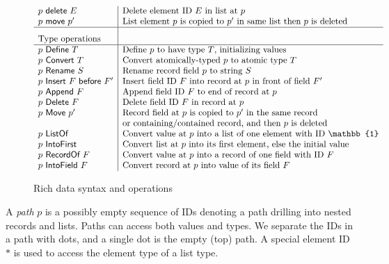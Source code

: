 \documentclass[english,submission]{programming}
\theoremstyle{definition}
\newcommand{\mathbox}[1]{\colorbox{black!10}{$#1$\phantom{i\hspace{-3.5pt}}}}
\providecommand{\DIFaddendFL}{} %
\begin{document}
\begin{figure}[h]
{\[\begin{array}{l|l}
  p \textsf{ delete } E & \textrm{Delete element ID $E$ in list at $p$}\\

  p \textsf{ move } p' & \textrm{List element $p$ is copied to $p'$ in same list then $p$ is deleted}\\
  \hline

  \textrm{Type operations} & \rule[0pt]{0pt}{16pt}\\
  \hline
  p \textsf{ Define } T & \textrm{Define $p$ to have type $T$, initializing values}\\
  p \textsf{ Convert } T & \textrm{Convert atomically-typed $p$ to atomic type $T$}\\

  p \textsf{ Rename } S & \textrm{Rename record field $p$ to string $S$}\\

  p \textsf{ Insert } F \textsf{ before } F' & \textrm{Insert field ID $F$ into record at $p$ in front of field $F'$}\\
  p \textsf{ Append } F & \textrm{Append field ID $F$ to end of record at $p$}\\

  p \textsf{ Delete } F & \textrm{Delete field ID $F$ in record at $p$}\\

  p \textsf{ Move } p' & \textrm{Record field at $p$ is copied to $p'$ in the same record}\\
  & \textrm{or containing\slash contained record, and then $p$ is deleted}\\


  p \textsf{ ListOf } & \textrm{Convert value at $p$ into a list of one element with ID $\mathbb{1}$}\\
  p \textsf{ IntoFirst } & \textrm{Convert list at $p$ into its first element, else the initial value} \\

  p \textsf{ RecordOf } F & \textrm{Convert value at $p$ into a record of one field with ID $F$} \\
  p \textsf{ IntoField } F & \textrm{Convert record at $p$ into value of its field $F$} \\

\end{array}\]
}
\vspace{-4pt}
\DIFaddendFL \caption{Rich data syntax and operations}
\label{fig:rich-data}
\end{figure}


A \textit{path} \mathbox{p} is a possibly empty sequence of IDs denoting a path drilling into nested records and lists. Paths can access both values and types. We separate the IDs in a path with dots, and a single dot is the empty (top) path. A special element ID~\mathbox{*} is used to access the element type of a list type.
\end{document}
